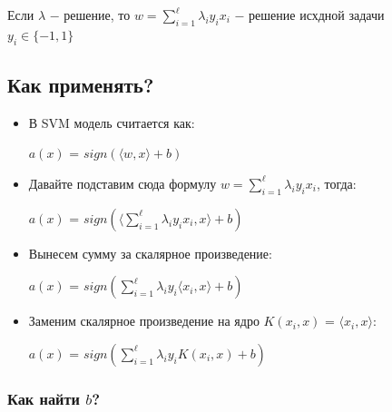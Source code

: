         Если $\lambda$ $-$ решение, то $w = \sum\limits_{i = 1}^\ell \lambda_i y_i x_i$ $-$ решение исхдной задачи\\

        $y_i \in \{ -1, 1 \}$

        \subsection{Как применять?}

        \begin{itemize}
            \item В SVM модель считается как:
                \begin{center}
                \Large
                    $a(x)$ = $sign(\langle w, x \rangle + b)$
                \end{center}

            \item Давайте подставим сюда формулу $w = \sum\limits_{i = 1}^\ell \lambda_i y_i x_i$, тогда:
            \begin{center}
                \Large
                $a(x)$ = $sign (\langle \sum\limits_{i = 1}^\ell \lambda_i y_i x_i, x \rangle + b )$
            \end{center}

            \item Вынесем сумму за скалярное произведение:
            \begin{center}
            \Large
                $a(x)$ = $sign (\sum\limits_{i = 1}^\ell \lambda_i y_i\langle x_i, x \rangle + b )$
            \end{center}

            \item Заменим скалярное произведение на ядро $K(x_i, x)$ = $\langle x_i, x \rangle$:
            \begin{center}
                \Large 
                $a(x)$ = $sign (\sum\limits_{i = 1}^\ell \lambda_i y_i K(x_i, x) + b )$
            \end{center}
        \end{itemize}

        \subsubsection{Как найти $b$?}

